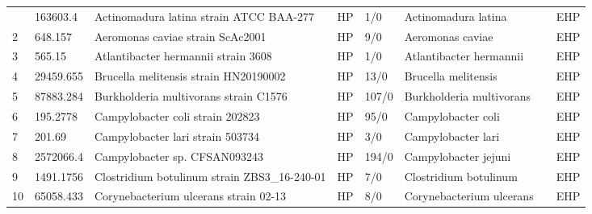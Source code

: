 \begin{longtable}{llllllll}
\bottomrule
\endlastfoot
1   &      163603.4 &                                  Actinomadura latina strain ATCC BAA-277 &    HP &       1/0 &                            Actinomadura latina &                                 \cite{trujillo1997polyphasic} &   EHP \\
2   &       648.157 &                                         Aeromonas caviae strain ScAc2001 &    HP &       9/0 &                               Aeromonas caviae &                                             \cite{tang2020co} &   EHP \\
3   &        565.15 &                                      Atlantibacter hermannii strain 3608 &    HP &       1/0 &                        Atlantibacter hermannii &                                 \cite{ioannou2019escherichia} &   EHP \\
4   &     29459.655 &                                    Brucella melitensis strain HN20190002 &    HP &      13/0 &                            Brucella melitensis &                                        \cite{li2020molecular} &   EHP \\
5   &     87883.284 &                                    Burkholderia multivorans strain C1576 &    HP &     107/0 &                       Burkholderia multivorans &                                          \cite{silva2016long} &   EHP \\
6   &      195.2778 &                                         Campylobacter coli strain 202823 &    HP &      95/0 &                             Campylobacter coli &                         \cite{sheppard2015evolution,195.2778} &   EHP \\
7   &        201.69 &                                         Campylobacter lari strain 503734 &    HP &       3/0 &                             Campylobacter lari &                                \cite{igwaran2019human,201.69} &   EHP \\
8   &     2572066.4 &                                            Campylobacter sp. CFSAN093243 &    HP &     194/0 &                           Campylobacter jejuni &            \cite{igwaran2019human,2572066.4,bravo2021genomic} &   EHP \\
9   &     1491.1756 &                             Clostridium botulinum strain ZBS3\_16-240-01 &    HP &       7/0 &                          Clostridium botulinum &                                         \cite{peck2016impact} &   EHP \\
10  &     65058.433 &                                    Corynebacterium ulcerans strain 02-13 &    HP &       8/0 &                       Corynebacterium ulcerans &                                     \cite{schaeffer2020draft} &   EHP \\

\end{longtable}
